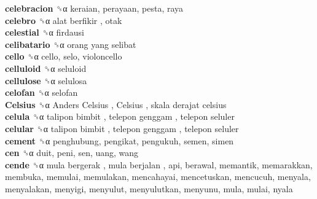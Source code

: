 \textbf{celebracion} ␝α  keraian, perayaan, pesta, raya  \\
\textbf{celebro} ␝α   alat berfikir , otak  \\
\textbf{celestial} ␝α  firdausi  \\
\textbf{celibatario} ␝α   orang yang selibat   \\
\textbf{cello} ␝α  cello, selo, violoncello  \\
\textbf{celluloid} ␝α  seluloid  \\
\textbf{cellulose} ␝α  selulosa  \\
\textbf{celofan} ␝α  selofan  \\
\textbf{Celsius} ␝α   Anders Celsius ,  Celsius ,  skala derajat celsius   \\
\textbf{celula} ␝α   talipon bimbit ,  telepon genggam ,  telepon seluler   \\
\textbf{celular} ␝α   talipon bimbit ,  telepon genggam ,  telepon seluler   \\
\textbf{cement} ␝α  penghubung, pengikat, pengukuh, semen, simen  \\
\textbf{cen} ␝α  duit, peni, sen, uang, wang  \\
\textbf{cende} ␝α   mula bergerak ,  mula berjalan , api, berawal, memantik, memarakkan, membuka, memulai, memulakan, mencahayai, mencetuskan, mencucuh, menyala, menyalakan, menyigi, menyulut, menyulutkan, menyunu, mula, mulai, nyala  \\
